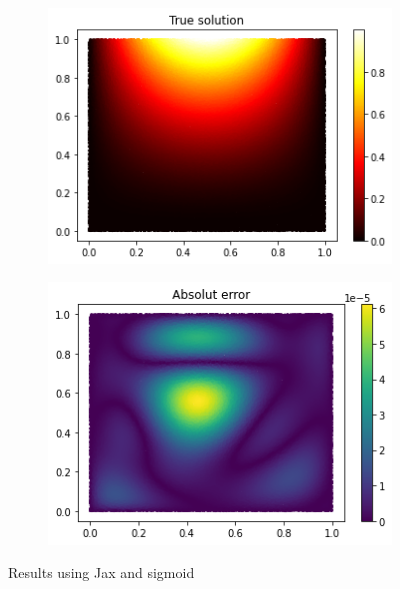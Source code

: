 \begin{figure}[H]
\begin{subfigure}{.45\textwidth}
    \includegraphics[width=.8\linewidth]{images/NN_Jax_PDE8_files_sigmoid/NN_Jax_PDE8_22_0.png}
    \label{fig:sub3}
    \end{subfigure}
\begin{subfigure}{.45\textwidth}
    \centering
    \includegraphics[width=.8\linewidth]{images/NN_Jax_PDE8_files_sigmoid/NN_Jax_PDE8_24_0.png}
    \label{fig:sub4}
\end{subfigure}
\caption{Results using Jax and sigmoid}
\label{fig:test}
\end{figure}

\vspace{-0.5cm}
